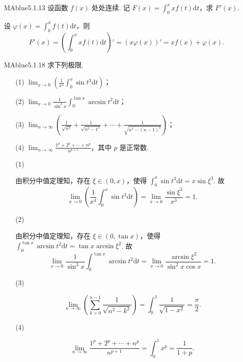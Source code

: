 \begin{problem}{MAblue}{5.1.13}
    设函数 $f(x)$ 处处连续. 记 $F(x) = \int_0^x xf(t) \mathrm dt$，求 $F'(x)$.
\end{problem}

\begin{solution}
    设 $\varphi(x) = \int_0^x f(t) \mathrm dt$，则
    \[
        F'(x) = \left(\int_0^x xf(t) \mathrm dt \right)' = \left( x \varphi(x) \right)' = xf(x) + \varphi(x).
    \]
\end{solution}

\begin{problem}{MAblue}{5.1.18}
    求下列极限.
    \begin{enumerate}
        \item[(1)]
        $\displaystyle \lim_{x \to 0} \left( \frac 1 {x^4} \int_0^x \sin t^3 \mathrm dt \right)$；
        \item[(2)]
        $\displaystyle \lim_{x \to 0} \frac 1 {\sin^3 x} \int_0^{\tan x} \arcsin t^2 \mathrm dt$；
        \item[(3)]
        $\displaystyle \lim_{n \to \infty} \left( \frac 1 {\sqrt{n^2}} + \frac 1 {\sqrt{n^2-1^2}} + \cdots + \frac 1 {\sqrt{n^2-(n-1)^2}} \right)$；
        \item[(4)]
        $\displaystyle \lim_{n \to \infty} \frac{1^p + 2^p + \cdots + n^p}{n^{p+1}}$，其中 $p$ 是正常数.
    \end{enumerate}
\end{problem}

\begin{enumerate}
    \item[(1)]
    \begin{solution}
        由积分中值定理知，存在 $\xi \in (0, x)$，使得 $\int_0^x \sin t^3 \mathrm dt = x \sin \xi^3$. 故
        \[
            \lim_{x \to 0} \left( \frac 1 {x^4} \int_0^x \sin t^3 \mathrm dt \right) = \lim_{x \to 0} \frac{\sin \xi^3}{x^3} = 1.
        \]
    \end{solution}
    \item[(2)]
    \begin{solution}
        由积分中值定理知，存在 $\xi \in (0, \tan x)$，使得 $\int_0^{\tan x} \arcsin t^2 \mathrm dt = \tan x \arcsin \xi^2$. 故
        \[
            \lim_{x \to 0} \frac 1 {\sin^3 x} \int_0^{\tan x} \arcsin t^2 \mathrm dt = \lim_{x \to 0} \frac{\arcsin \xi^2}{\sin^2 x \cos x} = 1.
        \]
    \end{solution}
    \item[(3)]
    \begin{solution}
        \[
            \lim_{n \to \infty} \left( \sum_{k=0}^{n-1} \frac 1 {\sqrt{n^2 - k^2}} \right) = \int_0^1 \frac 1 {\sqrt{1 - x^2}} = \frac \pi 2.
        \]
    \end{solution}
    \item[(4)]
    \begin{solution}
        \[
            \lim_{n \to \infty} \frac{1^p + 2^p + \cdots + n^p}{n^{p+1}} = \int_0^1 x^p = \frac 1 {1+p}.
        \]
    \end{solution}
\end{enumerate}

